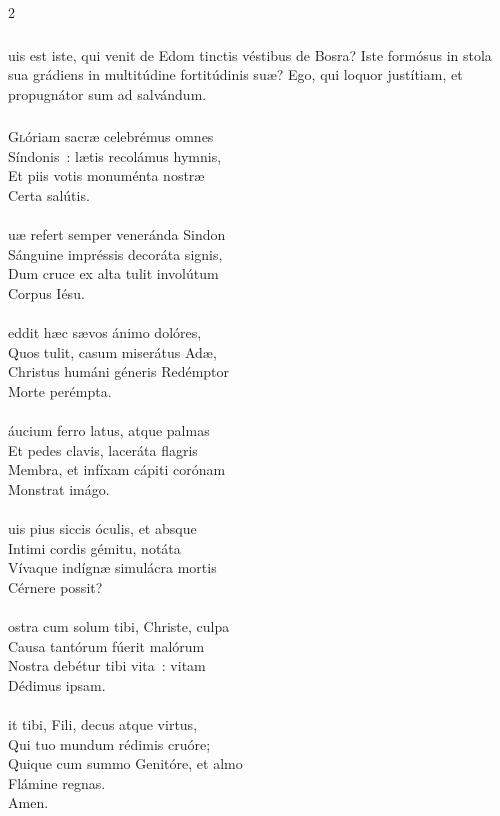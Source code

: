 \documentclass[9pt,twoside]{extarticle}
\begin{document}
\begin{multicols}{2}
\subsubsection*{}
uis est iste, qui venit de Edom tinctis véstibus de Bosra? Iste formósus in stola sua grádiens in multitúdine fortitúdinis suæ? Ego, qui loquor justítiam, et propugnátor sum ad salvándum.

\subsubsection*{\center {}}
\lettrine{G}lóriam sacræ celebrémus omnes\\
Síndonis~: lætis recolámus hymnis,\\
Et piis votis monuménta nostræ\\
Certa salútis.\\
\\
uæ refert semper veneránda Sindon\\
Sánguine impréssis decoráta signis,\\
Dum cruce ex alta tulit involútum\\
Corpus Iésu.\\
\\
eddit hæc sævos ánimo dolóres,\\
Quos tulit, casum miserátus Adæ,\\
Christus humáni géneris Redémptor\\
Morte perémpta.\\
\\
áucium ferro latus, atque palmas\\
Et pedes clavis, laceráta flagris\\
Membra, et infíxam cápiti corónam\\
Monstrat imágo.\\
\\
uis pius siccis óculis, et absque\\
Intimi cordis gémitu, notáta\\
Vívaque indígnæ simulácra mortis\\
Cérnere possit?\\
\\
ostra cum solum tibi, Christe, culpa\\
Causa tantórum fúerit malórum\\
Nostra debétur tibi vita~: vitam\\
Dédimus ipsam.\\
\\
it tibi, Fili, decus atque virtus,\\
Qui tuo mundum rédimis cruóre;\\
Quique cum summo Genitóre, et almo\\
Flámine regnas.\\
Amen.


\end{multicols}
\end{document}
